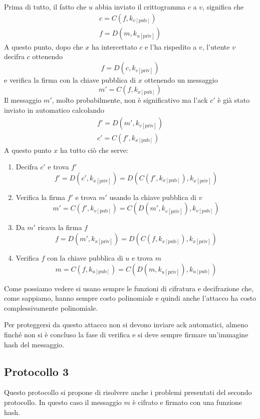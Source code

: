 Prima di tutto, il fatto che $u$ abbia inviato il crittogramma $c$ a $v$, significa che
\begin{gather*}
	c = C(f, k_{v [\text{pub}]}) \\
	f = D(m, k_{u [\text{priv}]})
\end{gather*}
A questo punto, dopo che $x$ ha intercettato $c$ e l'ha rispedito a $v$, l'utente $v$ decifra $c$ ottenendo
\[ f = D(c, k_{v [\text{priv}]}) \]
e verifica la firma con la chiave pubblica di $x$ ottenendo un messaggio
\[ m' = C(f, k_{x [\text{pub}]}) \]
Il messaggio $m'$, molto probabilmente, non \`e significativo ma l'ack $c'$ \`e gi\`a stato inviato in automatico
calcolando
\begin{gather*}
	f' = D(m', k_{v [\text{priv}]}) \\
	c' = C(f', k_{x [\text{pub}]})
\end{gather*}
A questo punto $x$ ha tutto ci\`o che serve:
\begin{enumerate}
	\item Decifra $c'$ e trova $f'$
	      \[ f' = D(c', k_{x [\text{priv}]}) = D(C(f', k_{x [\text{pub}]}), k_{x [\text{priv}]}) \]
	\item Verifica la firma $f'$ e trova $m'$ usando la chiave pubblica di $v$
	      \[ m' = C(f', k_{v [\text{pub}]}) = C(D(m', k_{v [\text{priv}]}), k_{v [\text{pub}]}) \]
	\item Da $m'$ ricava la firma $f$
	      \[ f = D(m', k_{x [\text{priv}]}) = D(C(f, k_{x [\text{pub}]}), k_{x [\text{priv}]}) \]
	\item Verifica $f$ con la chiave pubblica di $u$ e trova $m$
	      \[ m = C(f, k_{u [\text{pub}]}) = C(D(m, k_{u [\text{priv}]}), k_{u [\text{pub}]}) \]
\end{enumerate}
Come possiamo vedere si usano sempre le funzioni di cifratura e decifrazione che, come sappiamo, hanno sempre costo
polinomiale e quindi anche l'attacco ha costo complessivamente polinomiale.

Per proteggersi da questo attacco non si devono inviare ack automatici, almeno finch\'e non si \`e concluso la fase
di verifica e si deve sempre firmare un'immagine hash del messaggio.

\subsection{Protocollo 3}
Questo protocollo si propone di risolvere anche i problemi presentati del secondo protocollo. In questo caso il
messaggio $m$ \`e cifrato e firmato con una funzione hash.

